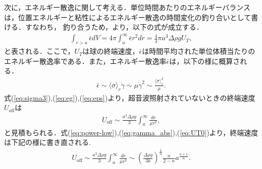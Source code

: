 次に，エネルギー散逸に関して考える．単位時間あたりのエネルギーバランスは，位置エネルギーと粘性によるエネルギー散逸の時間変化の釣り合いとして書ける．すなわち，
釣り合うため，より，以下の式が成立する．
\begin{eqnarray}
    \int_{r>a}\bar{\epsilon}dV = 4 \pi \int^\infty_a \bar{\epsilon}r^2 dr = \frac{4}{3}\pi a^3\Delta\rho g U_T ,
    \label{eq:eg}
\end{eqnarray}
と表される．ここで，$U_T$は球の終端速度，$\bar{\epsilon}$は時間平均された単位体積当たりのエネルギー散逸率である．また，エネルギー散逸率$\bar{\epsilon}$は，以下の様に概算される．
\begin{eqnarray}
    \bar{\epsilon} \sim \langle\sigma\rangle_r\dot{\gamma} \sim \mu \dot{\gamma}^2 \sim \frac{\langle\sigma\rangle_r^2}{\mu} .
    \label{eq:eps}
\end{eqnarray}
式(\ref{eq:sigma3}),(\ref{eq:eg}),(\ref{eq:eps})より，超音波照射されていないときの終端速度$U_\text{off}$は
\begin{eqnarray}
    U_\text{off} \sim \frac{a^3\Delta\rho g}{3}\int_a^\infty\frac{dr}{\mu r^2} ,
    \label{eq:UT0}
\end{eqnarray}
と見積もられる．式(\ref{eq:power-low}),(\ref{eq:gamma_abs}),(\ref{eq:UT0})より，終端速度は下記の様に書き直される.
\begin{eqnarray}
    U_\text{off} \sim \frac{a^3\Delta\rho g}{3}  \int^{\infty}_{a} \frac{dr}{\mu r^2} \sim \left(\frac{\Delta \rho g}{3k}\right)^{\frac{1}{n}}\frac{n}{2-n}a^{\frac{n+1}{n}} .
    \label{eq:UT}
\end{eqnarray}

